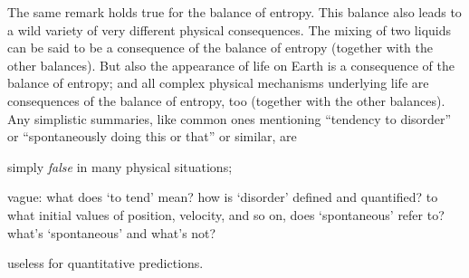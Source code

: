 \documentclass[a4paper,12pt,%
onecolumn,oneside,titlepage,%
british%
]{memoir}
\renewcommand*{\|}[1][]{\nonscript\:#1\vert\nonscript\:\mathopen{}}
\begin{document}
The same remark holds true for the balance of entropy. This balance also leads to a wild variety of very different physical consequences. The mixing of two liquids can be said to be a consequence of the balance of entropy (together with the other balances).
%
But also the appearance of life on Earth is a consequence of the balance of entropy; and all complex physical mechanisms underlying life are consequences of the balance of entropy, too (together with the other balances). Any simplistic summaries, like common ones mentioning \enquote{tendency to disorder} or \enquote{spontaneously doing this or that} or similar, are
\begin{enumerate*}[label=(\alph*)]
\item simply \emph{false} in many physical situations; \item vague: what does \enquote*{to tend} mean? how is \enquote*{disorder} defined and quantified? to what initial values of position, velocity, and so on, does \enquote*{spontaneous} refer to? what's \enquote*{spontaneous} and what's not? \item useless for quantitative predictions.
\end{enumerate*}
\end{document}
